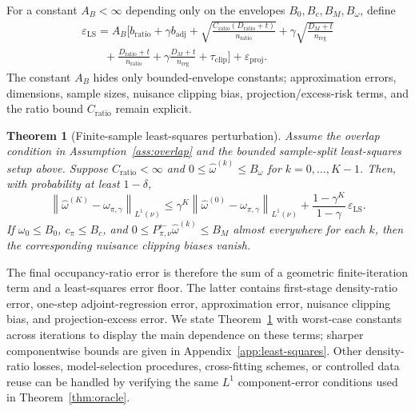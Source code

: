 \documentclass{article}
\newcommand{\1}{\mathbf{1}}
\newcommand{\cpi}{c_\pi}
\newcommand{\omegazero}{\omega_0}
\newcommand{\omegastar}{\omega_{\pi,\gamma}}
\newcommand{\Pback}{P_{\pi,\nu}^{\leftarrow}}
\newcommand{\Mpi}{\Pback}
\newcommand{\omegahat}{\widehat{\omega}}
\newcommand{\norm}[2][]{\left\lVert #2 \right\rVert_{#1}}
\newcommand{\LoneNu}[1]{\norm[L^1(\nu)]{#1}}
\theoremstyle{plain}
\newtheorem{theorem}{Theorem}[section]
\theoremstyle{definition}
\theoremstyle{remark}
\begin{document}
For a constant \(A_B<\infty\) depending only on the envelopes
\(B_0,B_c,B_M,B_\omega\), define
\begin{equation}
\label{eq:ls-statistical-floor}
\begin{aligned}
    \varepsilon_{\mathrm{LS}}
    =
    A_B\Bigg[
        b_{\mathrm{ratio}}
        + \gamma b_{\mathrm{adj}}
        + \sqrt{\frac{C_{\mathrm{ratio}}(D_{\mathrm{ratio}}+t)}
        {n_{\mathrm{ratio}}}}
        + \gamma\sqrt{\frac{D_M+t}{n_{\mathrm{reg}}}} \\
        \qquad
        + \frac{D_{\mathrm{ratio}}+t}{n_{\mathrm{ratio}}}
        + \gamma\frac{D_M+t}{n_{\mathrm{reg}}}
        + \tau_{\mathrm{clip}}
    \Bigg]
    +
    \varepsilon_{\mathrm{proj}} .
\end{aligned}
\end{equation}
The constant \(A_B\) hides only bounded-envelope constants; approximation
errors, dimensions, sample sizes, nuisance clipping bias, projection/excess-risk
terms, and the ratio bound \(C_{\mathrm{ratio}}\) remain explicit.


\begin{theorem}[Finite-sample least-squares perturbation]
\label{thm:ls-finite-sample}
Assume the overlap condition in Assumption~\ref{ass:overlap} and the bounded sample-split least-squares setup
above. Suppose $C_{\mathrm{ratio}}<\infty$ and
$0\le \omegahat^{(k)}\le B_\omega$ for $k=0,\ldots,K-1$. Then, with probability
at least $1-\delta$,
\[
    \LoneNu{\omegahat^{(K)}-\omegastar}
    \le
    \gamma^K\LoneNu{\omegahat^{(0)}-\omegastar}
    +
    \frac{1-\gamma^K}{1-\gamma}\,
    \varepsilon_{\mathrm{LS}} .
\]
If $\omegazero\le B_0$, $\cpi\le B_c$, and
$0\le \Mpi\omegahat^{(k)}\le B_M$ almost everywhere for each $k$, then the
corresponding nuisance clipping biases vanish.
\end{theorem}

The final occupancy-ratio error is therefore the sum of a geometric finite-iteration term
and a least-squares error floor. The latter contains first-stage density-ratio
error, one-step adjoint-regression error, approximation error, nuisance clipping bias,
and projection-excess error. We state Theorem~\ref{thm:ls-finite-sample} with
worst-case constants across iterations to display the main dependence on these
terms; sharper componentwise bounds are given in Appendix~\ref{app:least-squares}.
Other density-ratio losses, model-selection procedures, cross-fitting schemes,
or controlled data reuse can be handled by verifying the same $L^1$
component-error conditions used in Theorem~\ref{thm:oracle}.
\end{document}
